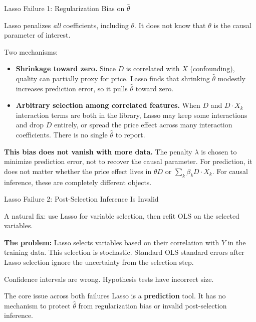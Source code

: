 \documentclass[aspectratio=169, 11pt]{beamer}
\begin{document}
\begin{frame}{Lasso Failure 1: Regularization Bias on $\hat{\theta}$}

Lasso penalizes \emph{all} coefficients, including $\theta$. It does not know that $\theta$ is the causal parameter of interest.

\bigskip
\pause

Two mechanisms:

\begin{itemize}
    \item \textbf{Shrinkage toward zero.} Since $D$ is correlated with $X$ (confounding), quality can partially proxy for price. Lasso finds that shrinking $\hat{\theta}$ modestly increases prediction error, so it pulls $\hat{\theta}$ toward zero.

    \item \textbf{Arbitrary selection among correlated features.} When $D$ and $D \cdot X_k$ interaction terms are both in the library, Lasso may keep some interactions and drop $D$ entirely, or spread the price effect across many interaction coefficients. There is no single $\hat{\theta}$ to report.
\end{itemize}

\bigskip
\pause

\textbf{This bias does not vanish with more data.} The penalty $\lambda$ is chosen to minimize prediction error, not to recover the causal parameter. For prediction, it does not matter whether the price effect lives in $\theta D$ or $\sum_k \beta_k D \cdot X_k$. For causal inference, these are completely different objects.

\end{frame}

\begin{frame}{Lasso Failure 2: Post-Selection Inference Is Invalid}

A natural fix: use Lasso for variable selection, then refit OLS on the selected variables.

\bigskip

\textbf{The problem:} Lasso selects variables based on their correlation with $Y$ in the training data. This selection is stochastic. Standard OLS standard errors after Lasso selection ignore the uncertainty from the selection step.

\bigskip
\pause

Confidence intervals are wrong. Hypothesis tests have incorrect size.

\bigskip

\begin{block}{The core issue across both failures}
Lasso is a \textbf{prediction} tool. It has no mechanism to protect $\hat{\theta}$ from regularization bias or invalid post-selection inference.
\end{block}

\end{frame}
\end{document}
